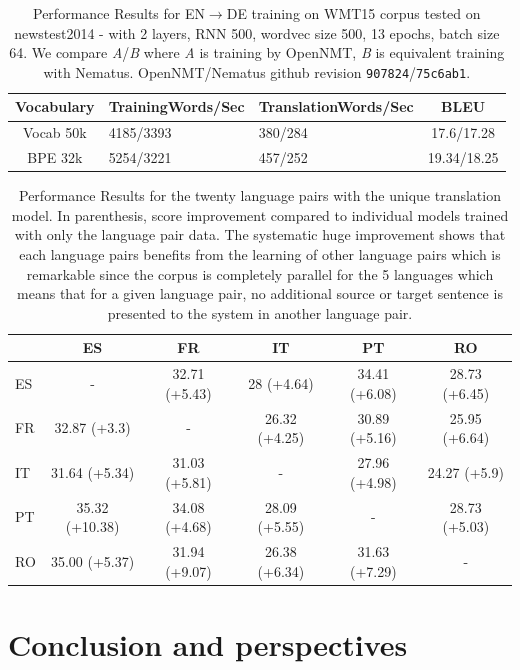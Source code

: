 \documentclass[11pt]{article}
\begin{document}
\begin{table}
 \small
  \centering
  \begin{tabular}{cp{10mm}p{10mm}c}
     Vocabulary & Training\newline Words/Sec & Translation\newline Words/Sec & BLEU \\
    \toprule
    Vocab 50k& 4185/3393 & 380/284 & 17.6/17.28\\
    \midrule
    BPE 32k& 5254/3221 & 457/252 & 19.34/18.25\\
    \bottomrule
  \end{tabular}
  \label{tab:res}
  \caption{Performance Results for EN$\rightarrow$DE training on WMT15 corpus tested on newstest2014 - with 2 layers, RNN 500, wordvec size 500, 13 epochs, batch size 64. We compare {\it A}/{\it B} where {\it A} is  training by OpenNMT, {\it B} is equivalent training with Nematus. OpenNMT/Nematus github revision {\tt 907824}/{\tt 75c6ab1}.}
\end{table}

\begin{table}
  \small \centering
  \begin{tabular}{lccccc}
    \toprule
          & ES & FR & IT & PT & RO \\
    \midrule
ES	& - & 32.71 (+5.43)	 & 28 (+4.64) & 34.41 (+6.08) & 28.73 (+6.45) \\ 
FR	& 32.87 (+3.3)	& -  & 26.32 (+4.25)	 & 30.89 (+5.16) & 25.95 (+6.64) \\
IT     & 31.64 (+5.34)	 & 31.03 (+5.81) & - & 27.96 (+4.98) & 24.27 (+5.9) \\
PT	& 35.32 (+10.38) & 34.08 (+4.68) & 28.09 (+5.55) & - & 28.73 (+5.03)\\
RO	& 35.00 (+5.37) & 31.94 (+9.07) & 26.38 (+6.34) & 31.63 (+7.29) & -\\
    \bottomrule
  \end{tabular}
  \label{tab:esfritptro}
  \caption{Performance Results for the twenty language pairs with the unique translation model. In parenthesis, score improvement compared to individual models trained with only the language pair data. The systematic huge improvement shows that each language pairs benefits from the learning of other language pairs which is remarkable since the corpus is completely parallel for the 5 languages which means that for a given language pair, no additional source or target sentence is presented to the system in another language pair.}
\end{table}


\section{Conclusion and perspectives}



\end{document}
